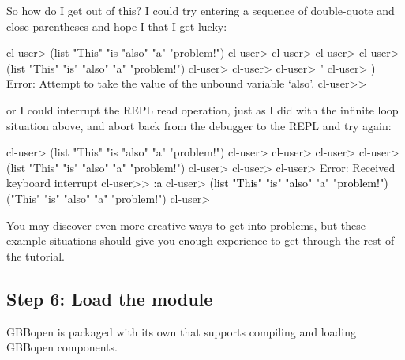 \documentclass[10pt,twoside,english,pdftex]{article}
\begin{document}
So how do I get out of this?  I could try entering a sequence of double-quote
and close parentheses and hope I that I get lucky:
%
\W\supp
\begin{example}
\textcolor{darkergray}{%
  cl-user> (list "This" "is "also" "a" "problem!")
  cl-user>
  cl-user>
  cl-user>
  cl-user> (list "This" "is" "also" "a" "problem!")
  cl-user>
  cl-user>
  cl-user> \textcolor{black}{"}
  cl-user> \textcolor{black}{)}
  Error: Attempt to take the value of the unbound variable `also'.
  cl-user>>}
\end{example}
%
or I could interrupt the REPL read operation, just as I did with the infinite
loop situation above, and abort back from the debugger to the REPL and try
again:
%
\W\supp\notpretop
\begin{example}
\textcolor{darkergray}{%
  cl-user> (list "This" "is "also" "a" "problem!")
  cl-user>
  cl-user>
  cl-user>
  cl-user> (list "This" "is" "also" "a" "problem!")
  cl-user>
  cl-user>
  cl-user> \textcolor{black}{}
  Error: Received keyboard interrupt 
  cl-user>> \textcolor{black}{:a}
  cl-user> \textcolor{black}{(list "This" "is" "also" "a" "problem!")}
  ("This" "is" "also" "a" "problem!")
  cl-user>}
\end{example}

You may discover even more creative ways to get into problems, but these
example situations should give you enough experience to get through the rest
of the tutorial.

\subsection*{Step 6: Load the  module}

GBBopen is packaged with its own 
that supports compiling and loading GBBopen components.
\end{document}
